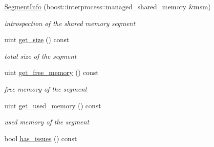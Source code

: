 \begin{DoxyCompactItemize}
\item 
\hyperlink{classshared__memory_1_1SegmentInfo_a254ed3b9d7e7e69a6888c9927504fe3b}{Segment\+Info} (boost\+::interprocess\+::managed\+\_\+shared\+\_\+memory \&msm)\hypertarget{classshared__memory_1_1SegmentInfo_a254ed3b9d7e7e69a6888c9927504fe3b}{}\label{classshared__memory_1_1SegmentInfo_a254ed3b9d7e7e69a6888c9927504fe3b}

\begin{DoxyCompactList}\small\item\em introspection of the shared memory segment \end{DoxyCompactList}\item 
uint \hyperlink{classshared__memory_1_1SegmentInfo_a0ab35167b7075c39adc5493511104b09}{get\+\_\+size} () const \hypertarget{classshared__memory_1_1SegmentInfo_a0ab35167b7075c39adc5493511104b09}{}\label{classshared__memory_1_1SegmentInfo_a0ab35167b7075c39adc5493511104b09}

\begin{DoxyCompactList}\small\item\em total size of the segment \end{DoxyCompactList}\item 
uint \hyperlink{classshared__memory_1_1SegmentInfo_aa91bb7d043ff723bc134fd4bcf38f718}{get\+\_\+free\+\_\+memory} () const \hypertarget{classshared__memory_1_1SegmentInfo_aa91bb7d043ff723bc134fd4bcf38f718}{}\label{classshared__memory_1_1SegmentInfo_aa91bb7d043ff723bc134fd4bcf38f718}

\begin{DoxyCompactList}\small\item\em free memory of the segment \end{DoxyCompactList}\item 
uint \hyperlink{classshared__memory_1_1SegmentInfo_a4c9c901d3220009dfb73fec4b0592a64}{get\+\_\+used\+\_\+memory} () const \hypertarget{classshared__memory_1_1SegmentInfo_a4c9c901d3220009dfb73fec4b0592a64}{}\label{classshared__memory_1_1SegmentInfo_a4c9c901d3220009dfb73fec4b0592a64}

\begin{DoxyCompactList}\small\item\em used memory of the segment \end{DoxyCompactList}\item 
bool \hyperlink{classshared__memory_1_1SegmentInfo_ace1754181cbe2be66e2eaebac7342795}{has\+\_\+issues} () const \hypertarget{classshared__memory_1_1SegmentInfo_ace1754181cbe2be66e2eaebac7342795}{}\label{classshared__memory_1_1SegmentInfo_ace1754181cbe2be66e2eaebac7342795}


\end{DoxyCompactItemize}
